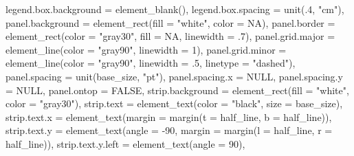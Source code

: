 \documentclass[
  letterpaper,
]{scrbook}
\newenvironment{Shaded}{\begin{snugshade}}{\end{snugshade}}
\newcommand{\AttributeTok}[1]{\textcolor[rgb]{0.40,0.45,0.13}{#1}}
\newcommand{\ConstantTok}[1]{\textcolor[rgb]{0.56,0.35,0.01}{#1}}
\newcommand{\DecValTok}[1]{\textcolor[rgb]{0.68,0.00,0.00}{#1}}
\newcommand{\FunctionTok}[1]{\textcolor[rgb]{0.28,0.35,0.67}{#1}}
\newcommand{\NormalTok}[1]{\textcolor[rgb]{0.00,0.23,0.31}{#1}}
\newcommand{\SpecialCharTok}[1]{\textcolor[rgb]{0.37,0.37,0.37}{#1}}
\newcommand{\StringTok}[1]{\textcolor[rgb]{0.13,0.47,0.30}{#1}}
\begin{document}
\begin{Shaded}
\begin{Highlighting}[]
    \AttributeTok{legend.box.background =} \FunctionTok{element\_blank}\NormalTok{(),}
    \AttributeTok{legend.box.spacing =} \FunctionTok{unit}\NormalTok{(.}\DecValTok{4}\NormalTok{, }\StringTok{"cm"}\NormalTok{),}
    \AttributeTok{panel.background =} \FunctionTok{element\_rect}\NormalTok{(}\AttributeTok{fill =} \StringTok{"white"}\NormalTok{, }\AttributeTok{color =} \ConstantTok{NA}\NormalTok{),}
    \AttributeTok{panel.border =} \FunctionTok{element\_rect}\NormalTok{(}\AttributeTok{color =} \StringTok{"gray30"}\NormalTok{,}
                                \AttributeTok{fill =} \ConstantTok{NA}\NormalTok{, }\AttributeTok{linewidth =}\NormalTok{ .}\DecValTok{7}\NormalTok{),}
    \AttributeTok{panel.grid.major =} \FunctionTok{element\_line}\NormalTok{(}\AttributeTok{color =} \StringTok{"gray90"}\NormalTok{, }\AttributeTok{linewidth =} \DecValTok{1}\NormalTok{),}
    \AttributeTok{panel.grid.minor =} \FunctionTok{element\_line}\NormalTok{(}\AttributeTok{color =} \StringTok{"gray90"}\NormalTok{, }\AttributeTok{linewidth =}\NormalTok{ .}\DecValTok{5}\NormalTok{,}
                                    \AttributeTok{linetype =} \StringTok{"dashed"}\NormalTok{),}
    \AttributeTok{panel.spacing =} \FunctionTok{unit}\NormalTok{(base\_size, }\StringTok{"pt"}\NormalTok{),}
    \AttributeTok{panel.spacing.x =} \ConstantTok{NULL}\NormalTok{,}
    \AttributeTok{panel.spacing.y =} \ConstantTok{NULL}\NormalTok{,}
    \AttributeTok{panel.ontop =} \ConstantTok{FALSE}\NormalTok{,}
    \AttributeTok{strip.background =} \FunctionTok{element\_rect}\NormalTok{(}\AttributeTok{fill =} \StringTok{"white"}\NormalTok{, }\AttributeTok{color =} \StringTok{"gray30"}\NormalTok{),}
    \AttributeTok{strip.text =} \FunctionTok{element\_text}\NormalTok{(}\AttributeTok{color =} \StringTok{"black"}\NormalTok{, }\AttributeTok{size =}\NormalTok{ base\_size),}
    \AttributeTok{strip.text.x =} \FunctionTok{element\_text}\NormalTok{(}\AttributeTok{margin =} \FunctionTok{margin}\NormalTok{(}\AttributeTok{t =}\NormalTok{ half\_line,}
                                                \AttributeTok{b =}\NormalTok{ half\_line)),}
    \AttributeTok{strip.text.y =} \FunctionTok{element\_text}\NormalTok{(}\AttributeTok{angle =} \SpecialCharTok{{-}}\DecValTok{90}\NormalTok{,}
                                \AttributeTok{margin =} \FunctionTok{margin}\NormalTok{(}\AttributeTok{l =}\NormalTok{ half\_line,}
                                                \AttributeTok{r =}\NormalTok{ half\_line)),}
    \AttributeTok{strip.text.y.left =} \FunctionTok{element\_text}\NormalTok{(}\AttributeTok{angle =} \DecValTok{90}\NormalTok{),}

\end{Highlighting}
\end{Shaded}
\end{document}
